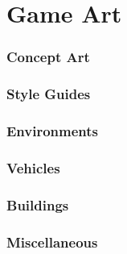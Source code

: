 \part{Game Art}
\section{Concept Art} %
\section{Style Guides} %
\section{Environments} %
\section{Vehicles} %
\section{Buildings} %
\section{Miscellaneous} %
